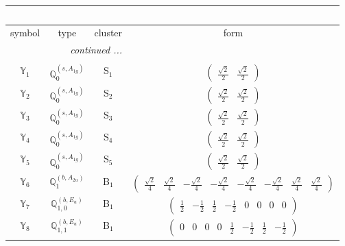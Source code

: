\documentclass[fleqn,10pt,landscape]{article}
\begin{document}
\begin{itemize}
\begin{center}
\begin{longtable}{c|c|c|c}
\multicolumn{3}{l}{\tablename\ \thetable{}} \\
 \hline \hline
symbol & type & cluster & form \\ \hline \endhead

 \hline \hline
\multicolumn{3}{r}{\footnotesize\it continued ...} \\ \endfoot

 \hline \hline
\multicolumn{3}{r}{} \\ \endlastfoot

$ \mathbb{Y}_{1} $ & $\mathbb{Q}_{0}^{(s,A_{1g})}$ & S$_{1}$ & $\begin{pmatrix} \frac{\sqrt{2}}{2} & \frac{\sqrt{2}}{2} \end{pmatrix}$ \\ \hline
$ \mathbb{Y}_{2} $ & $\mathbb{Q}_{0}^{(s,A_{1g})}$ & S$_{2}$ & $\begin{pmatrix} \frac{\sqrt{2}}{2} & \frac{\sqrt{2}}{2} \end{pmatrix}$ \\ \hline
$ \mathbb{Y}_{3} $ & $\mathbb{Q}_{0}^{(s,A_{1g})}$ & S$_{3}$ & $\begin{pmatrix} \frac{\sqrt{2}}{2} & \frac{\sqrt{2}}{2} \end{pmatrix}$ \\ \hline
$ \mathbb{Y}_{4} $ & $\mathbb{Q}_{0}^{(s,A_{1g})}$ & S$_{4}$ & $\begin{pmatrix} \frac{\sqrt{2}}{2} & \frac{\sqrt{2}}{2} \end{pmatrix}$ \\ \hline
$ \mathbb{Y}_{5} $ & $\mathbb{Q}_{0}^{(s,A_{1g})}$ & S$_{5}$ & $\begin{pmatrix} \frac{\sqrt{2}}{2} & \frac{\sqrt{2}}{2} \end{pmatrix}$ \\ \hline
$ \mathbb{Y}_{6} $ & $\mathbb{Q}_{1}^{(b,A_{2u})}$ & B$_{1}$ & $\begin{pmatrix} \frac{\sqrt{2}}{4} & \frac{\sqrt{2}}{4} & - \frac{\sqrt{2}}{4} & - \frac{\sqrt{2}}{4} & - \frac{\sqrt{2}}{4} & - \frac{\sqrt{2}}{4} & \frac{\sqrt{2}}{4} & \frac{\sqrt{2}}{4} \end{pmatrix}$ \\
$ \mathbb{Y}_{7} $ & $\mathbb{Q}_{1,0}^{(b,E_{u})}$ & B$_{1}$ & $\begin{pmatrix} \frac{1}{2} & - \frac{1}{2} & \frac{1}{2} & - \frac{1}{2} & 0 & 0 & 0 & 0 \end{pmatrix}$ \\
$ \mathbb{Y}_{8} $ & $\mathbb{Q}_{1,1}^{(b,E_{u})}$ & B$_{1}$ & $\begin{pmatrix} 0 & 0 & 0 & 0 & \frac{1}{2} & - \frac{1}{2} & \frac{1}{2} & - \frac{1}{2} \end{pmatrix}$ \\

\end{longtable}
\end{center}
\end{itemize}
\end{document}
